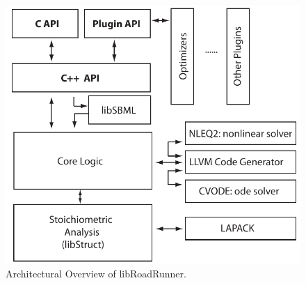 \documentclass{bioinfo}
\begin{document}
\begin{figure}[!htpb]%
\centerline{\includegraphics[scale=0.55]{roadRunnerOverview.pdf}}
\caption{Architectural Overview of libRoadRunner.}\label{fig:01}
\end{figure}
\end{document}
